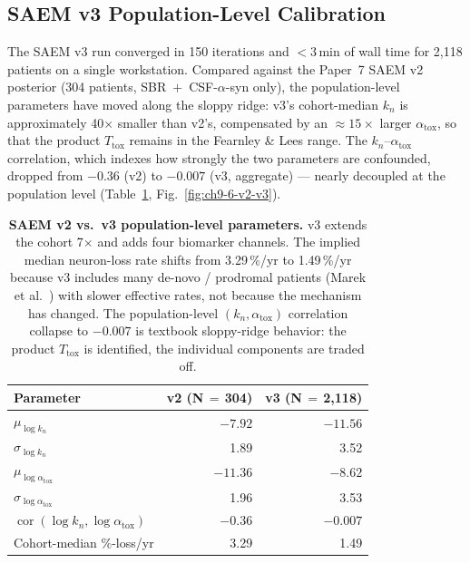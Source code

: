 \subsection{SAEM v3 Population-Level Calibration}
\label{subsec:ch9-6-saem}

The SAEM v3 run converged in 150 iterations and $<$3\,min of wall time for 2,118 patients on a single workstation. Compared against the Paper~7 SAEM v2 posterior (304 patients, SBR~$+$~CSF-$\alpha$-syn only), the population-level parameters have moved along the sloppy ridge: v3's cohort-median $k_n$ is approximately 40$\times$ smaller than v2's, compensated by an $\approx 15\times$ larger $\alpha_\text{tox}$, so that the product $T_\text{tox}$ remains in the Fearnley \& Lees range. The $k_n$--$\alpha_\text{tox}$ correlation, which indexes how strongly the two parameters are confounded, dropped from $-0.36$ (v2) to $-0.007$ (v3, aggregate) --- nearly decoupled at the population level (Table~\ref{tab:ch9-6-saem-pop}, Fig.~\ref{fig:ch9-6-v2-v3}).

\begin{table}[t!]
\centering
\caption[SAEM v2 (304 pts) vs.\ v3 (2{,}118 pts) population-level parameters]{\textbf{SAEM v2 vs.\ v3 population-level parameters.} v3 extends the cohort 7$\times$ and adds four biomarker channels. The implied median neuron-loss rate shifts from 3.29\,\%/yr to 1.49\,\%/yr because v3 includes many de-novo / prodromal patients (Marek et al.~\cite{marek2018ppmi}) with slower effective rates, not because the mechanism has changed. The population-level $(k_n, \alpha_\text{tox})$ correlation collapse to $-0.007$ is textbook sloppy-ridge behavior: the product $T_\text{tox}$ is identified, the individual components are traded off.}
\label{tab:ch9-6-saem-pop}
\small
\begin{tabular}{lrr}
\toprule
\textbf{Parameter} & \textbf{v2 (N\,$=$\,304)} & \textbf{v3 (N\,$=$\,2{,}118)} \\
\midrule
$\mu_{\log k_n}$                  & $-7.92$ & $-11.56$ \\
$\sigma_{\log k_n}$               & 1.89    & 3.52 \\
$\mu_{\log \alpha_\text{tox}}$    & $-11.36$ & $-8.62$ \\
$\sigma_{\log \alpha_\text{tox}}$ & 1.96    & 3.53 \\
$\operatorname{cor}(\log k_n, \log \alpha_\text{tox})$ & $-0.36$ & $-0.007$ \\
Cohort-median $\%$-loss/yr        & 3.29 & 1.49 \\
\bottomrule
\end{tabular}
\end{table}

